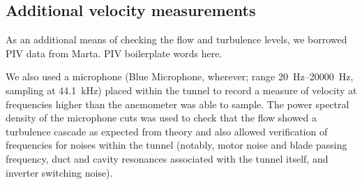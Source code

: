 \subsection{Additional velocity measurements}
As an additional means of checking the flow and turbulence levels, we borrowed PIV data from Marta.  PIV boilerplate words here. 

We also used a microphone (Blue Microphone, wherever; range \SIrange{20}{20000}{\hertz}, sampling at \SI{44.1}{\kilo\hertz}) placed within the tunnel to record a measure of velocity at frequencies higher than the anemometer was able to sample.  The power spectral density of the microphone cuts was used to check that the flow showed a turbulence cascade as expected from theory and also allowed verification of frequencies for noises within the tunnel (notably, motor noise and blade passing frequency, duct and cavity resonances associated with the tunnel itself, and inverter switching noise). 




